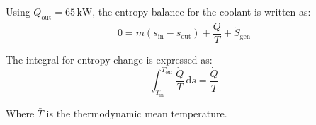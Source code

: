 Using \( \dot{Q}_{\text{out}} = 65 \, \text{kW} \), the entropy balance for the coolant is written as:  
\[
0 = \dot{m} \left( s_{\text{in}} - s_{\text{out}} \right) + \frac{\dot{Q}}{T} + \dot{S}_{\text{gen}}
\]  

The integral for entropy change is expressed as:  
\[
\int_{T_{\text{in}}}^{T_{\text{out}}} \frac{\dot{Q}}{T} \, \text{d}s = \frac{\dot{Q}}{\bar{T}}
\]  

Where \( \bar{T} \) is the thermodynamic mean temperature.